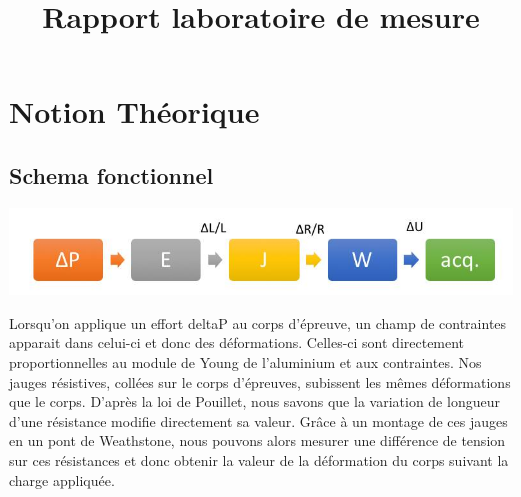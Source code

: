\documentclass[11pt,a4paper]{report}
\begin{document}
\tableofcontents
\title{Rapport laboratoire de mesure}
\part{Notion Théorique}
\chapter{Schema fonctionnel}
\begin{center}
\includegraphics[scale=0.5]{image1.jpg} 
\end{center}

Lorsqu'on applique un effort deltaP au corps d'épreuve, un champ de contraintes apparait dans celui-ci et donc des déformations. Celles-ci sont directement proportionnelles au module de Young de l'aluminium et aux contraintes. Nos jauges résistives, collées sur le corps d'épreuves, subissent les mêmes déformations que le corps. D'après la loi de Pouillet, nous savons que la variation de longueur d'une résistance modifie directement sa valeur. Grâce à un montage de ces jauges en un pont de Weathstone, nous pouvons alors mesurer une différence de tension sur ces résistances et donc obtenir la valeur de la déformation du corps suivant la charge appliquée.
\end{document}
